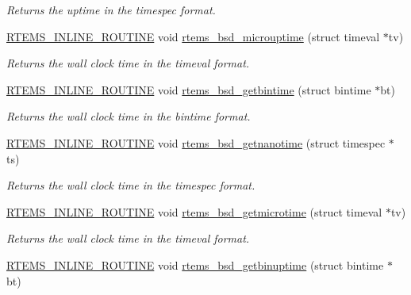 \begin{DoxyCompactItemize}
\begin{DoxyCompactList}\small\item\em Returns the uptime in the timespec format. \end{DoxyCompactList}\item 
\mbox{\hyperlink{group__RTEMSScoreBaseDefs_gac216239df231d5dbd15e3520b0b9313f}{R\+T\+E\+M\+S\+\_\+\+I\+N\+L\+I\+N\+E\+\_\+\+R\+O\+U\+T\+I\+NE}} void \mbox{\hyperlink{group__RTEMSAPIBSD_gacc5770a94a216502f4775e7b2a404409}{rtems\+\_\+bsd\+\_\+microuptime}} (struct timeval $\ast$tv)
\begin{DoxyCompactList}\small\item\em Returns the wall clock time in the timeval format. \end{DoxyCompactList}\item 
\mbox{\hyperlink{group__RTEMSScoreBaseDefs_gac216239df231d5dbd15e3520b0b9313f}{R\+T\+E\+M\+S\+\_\+\+I\+N\+L\+I\+N\+E\+\_\+\+R\+O\+U\+T\+I\+NE}} void \mbox{\hyperlink{group__RTEMSAPIBSD_ga09f1469107527aca93bf26c775b631d2}{rtems\+\_\+bsd\+\_\+getbintime}} (struct bintime $\ast$bt)
\begin{DoxyCompactList}\small\item\em Returns the wall clock time in the bintime format. \end{DoxyCompactList}\item 
\mbox{\hyperlink{group__RTEMSScoreBaseDefs_gac216239df231d5dbd15e3520b0b9313f}{R\+T\+E\+M\+S\+\_\+\+I\+N\+L\+I\+N\+E\+\_\+\+R\+O\+U\+T\+I\+NE}} void \mbox{\hyperlink{group__RTEMSAPIBSD_ga3503efd308939dc0fafe4912f41ddcc0}{rtems\+\_\+bsd\+\_\+getnanotime}} (struct timespec $\ast$ts)
\begin{DoxyCompactList}\small\item\em Returns the wall clock time in the timespec format. \end{DoxyCompactList}\item 
\mbox{\hyperlink{group__RTEMSScoreBaseDefs_gac216239df231d5dbd15e3520b0b9313f}{R\+T\+E\+M\+S\+\_\+\+I\+N\+L\+I\+N\+E\+\_\+\+R\+O\+U\+T\+I\+NE}} void \mbox{\hyperlink{group__RTEMSAPIBSD_gaec9940c84580187d5e9792661d5e595b}{rtems\+\_\+bsd\+\_\+getmicrotime}} (struct timeval $\ast$tv)
\begin{DoxyCompactList}\small\item\em Returns the wall clock time in the timeval format. \end{DoxyCompactList}\item 
\mbox{\hyperlink{group__RTEMSScoreBaseDefs_gac216239df231d5dbd15e3520b0b9313f}{R\+T\+E\+M\+S\+\_\+\+I\+N\+L\+I\+N\+E\+\_\+\+R\+O\+U\+T\+I\+NE}} void \mbox{\hyperlink{group__RTEMSAPIBSD_gad5d1a9f6ecb7cc442d8350e92dcd9cdc}{rtems\+\_\+bsd\+\_\+getbinuptime}} (struct bintime $\ast$bt)

\end{DoxyCompactItemize}
